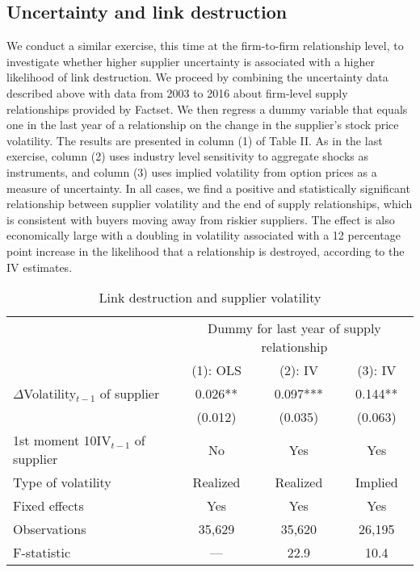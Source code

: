\documentclass[11pt]{article}
\theoremstyle{definition}
\begin{document}
	\subsection{Uncertainty and link destruction}
	We conduct a similar exercise, this time at the firm-to-firm relationship level, to investigate whether higher supplier uncertainty is associated with a higher likelihood of link destruction. We proceed by combining the uncertainty data described above with data from 2003 to 2016 about firm-level supply relationships provided by Factset. We then regress a dummy variable that equals one in the last year of a relationship on the change in the supplier’s stock price volatility. The results are presented in column (1) of Table II. As in the last exercise, column (2) uses industry level sensitivity to aggregate shocks as instruments, and column (3) uses implied volatility from option prices as a measure of uncertainty. In all cases, we find a positive and statistically significant relationship between supplier volatility and the end of supply relationships, which is consistent with buyers moving away from riskier suppliers. The effect is also economically large with a doubling in volatility associated with a 12 percentage point increase in the likelihood that a relationship is destroyed, according to the IV estimates.
	
	\begin{table}[ht]
		\centering
		\caption{Link destruction and supplier volatility}
		\begin{tabular}{lccc}
				\hline
				& \multicolumn{3}{c}{Dummy for last year of supply relationship} \\
				\cline{2-4}
				& (1): OLS & (2): IV & (3): IV \\
				\hline
				$\Delta$Volatility$_{t-1}$ of supplier & 0.026** & 0.097*** & 0.144** \\
				& (0.012) & (0.035) & (0.063) \\
				1st moment 10IV$_{t-1}$ of supplier & No & Yes & Yes \\
				Type of volatility & Realized & Realized & Implied \\
				Fixed effects & Yes & Yes & Yes \\
				Observations & 35,629 & 35,620 & 26,195 \\
				F-statistic & --- & 22.9 & 10.4 \\
				\hline
		\end{tabular}
	\end{table}
	
\end{document}
